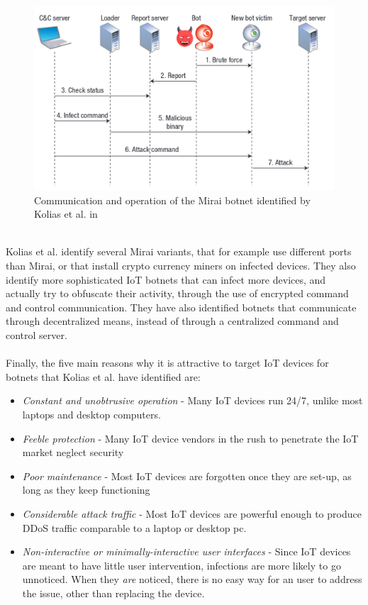 \documentclass[a4paper,10pt]{article}
\begin{document}
\begin{figure}[hbtp]
 \centering
 \includegraphics[width=0.8\linewidth]{kolias.png}
 \caption{Communication and operation of the Mirai botnet identified by Kolias et al. in \cite{Kolias2017}}
 \label{fig:kolias_communication}
\end{figure}
~\\
Kolias et al. identify several Mirai variants, that for example use different ports than Mirai, or that install crypto currency
miners on infected devices. They also identify more sophisticated IoT botnets that can infect more devices, and actually
try to obfuscate their activity, through the use of encrypted command and control communication. They have also 
identified botnets that communicate through decentralized means, instead of through a centralized command and 
control server.
\\\\
Finally, the five main reasons why it is attractive to target IoT devices for botnets that Kolias et al. have identified are:
\begin{itemize}
 \item \textit{Constant and unobtrusive operation} - Many IoT devices run 24/7, unlike most laptops and desktop 
 computers.
 \item \textit{Feeble protection} - Many IoT device vendors in the rush to penetrate the IoT market neglect security
 \item \textit{Poor maintenance} - Most IoT devices are forgotten once they are set-up, as long as they keep functioning
 \item \textit{Considerable attack traffic} - Most IoT devices are powerful enough to produce DDoS traffic comparable 
 to a laptop or desktop pc.
 \item \textit{Non-interactive or minimally-interactive user interfaces} - Since IoT devices are meant to have little user 
 intervention, infections are more likely to go unnoticed. When they \textit{are} noticed, there is no easy way for an user
 to address the issue, other than replacing the device.
\end{itemize}
\end{document}
